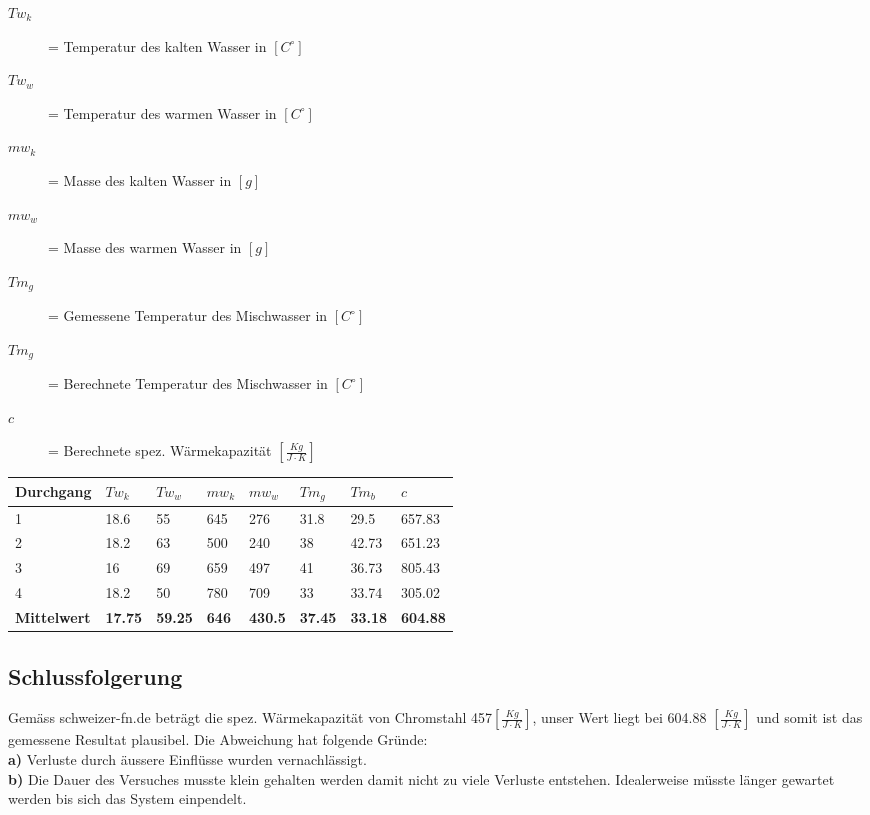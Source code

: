 \documentclass{article}
\begin{document}
  \begin{description}
    \item[\textbf{ $Tw_k$}]= Temperatur des kalten Wasser in $[C^\circ]$
    \item[\textbf{ $Tw_w$}]= Temperatur des warmen Wasser in $[C^\circ]$
    \item[\textbf{ $mw_k$}]= Masse des kalten Wasser in $[g]$
    \item[\textbf{ $mw_w$}]= Masse des warmen Wasser in $[g]$
    \item[\textbf{ $Tm_g$}]= Gemessene Temperatur des Mischwasser in  $[C^\circ]$
    \item[\textbf{ $Tm_g$}]= Berechnete Temperatur des Mischwasser in  $[C^\circ]$
    \item[\textbf{ $c$}]=  Berechnete spez. Wärmekapazität  $[\frac{Kg}{J \cdot K}]$
    
  \end{description}
\begin{table}[h]
    \begin{tabular}{|l|l|l|l|l|l|l|l|}
    
        \hline
        Durchgang &\textbf{$Tw_k$} &\textbf{$Tw_w$}& \textbf{$mw_k$}&\textbf{$mw_w$}&\textbf{$Tm_g$}&\textbf{$Tm_b$}&\textbf{$c$}\\ \hline
        1         & 18.6 & 55 & 645& 276 & 31.8 &29.5&657.83\\ 
        2         & 18.2 & 63 &500 &240  & 38 &42.73&651.23\\ 
        3         & 16 & 69 &659 &497  &41 &36.73&805.43\\ 
        4         &  18.2  &50 & 780 & 709 &33&33.74&305.02\\ \hline
        \textbf{Mittelwert} &\textbf{17.75}&\textbf{59.25}&\textbf{646}  &\textbf{430.5}  &\textbf{37.45} &\textbf{33.18}&\textbf{604.88} \\ 
        \hline
    \end{tabular}
\end{table}

\subsection*{Schlussfolgerung}
Gemäss schweizer-fn.de beträgt die spez. Wärmekapazität von Chromstahl 457$[\frac{Kg}{J \cdot K}]$, unser Wert liegt bei 604.88 $[\frac{Kg}{J \cdot K}]$ und somit ist das gemessene Resultat plausibel. Die Abweichung hat folgende Gründe:\\
\textbf{a)} Verluste durch äussere Einflüsse wurden vernachlässigt.\\
\textbf{b)} Die Dauer des Versuches musste klein gehalten werden damit nicht zu viele Verluste entstehen. Idealerweise müsste länger gewartet werden bis sich das System einpendelt.
\end{document}
